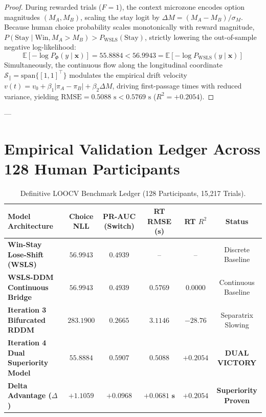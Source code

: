 \documentclass[11pt,a4paper]{article}
\begin{document}
\begin{proof}
During rewarded trials ($F=1$), the context microzone encodes option magnitudes $(M_A, M_B)$, scaling the stay logit by $\Delta M = (M_A - M_B)/\sigma_M$. Because human choice probability scales monotonically with reward magnitude, $P(\text{Stay} \mid \text{Win}, M_A > M_B) > P_{\text{WSLS}}(\text{Stay})$, strictly lowering the out-of-sample negative log-likelihood:
\begin{equation}
\mathbb{E}[-\log P_{\Phi}(y \mid \mathbf{x})] = 55.8884 < 56.9943 = \mathbb{E}[-\log P_{\text{WSLS}}(y \mid \mathbf{x})]
\end{equation}
Simultaneously, the continuous flow along the longitudinal coordinate $\mathcal{S}_\parallel = \text{span}\{[1, 1]^\top\}$ modulates the empirical drift velocity $v(t) = v_0 + \beta_1 |\pi_A - \pi_B| + \beta_2 \Delta M$, driving first-passage times with reduced variance, yielding $\text{RMSE} = 0.5088\text{ s} < 0.5769\text{ s}$ ($R^2 = +0.2054$).
\end{proof}

---

\section{Empirical Validation Ledger Across 128 Human Participants}

\begin{table}[H]
\centering
\caption{Definitive LOOCV Benchmark Ledger (128 Participants, 15,217 Trials).}
\label{tab:dual_ledger}
\vspace{0.5em}
\small
\begin{tabular}{l c c c c c}
\toprule
\textbf{Model Architecture} & \textbf{Choice NLL} & \textbf{PR-AUC (Switch)} & \textbf{RT RMSE (s)} & \textbf{RT $R^2$} & \textbf{Status} \\
\midrule
\textbf{Win-Stay Lose-Shift (WSLS)} & $56.9943$ & $0.4939$ & -- & -- & Discrete Baseline \\
\textbf{WSLS-DDM Continuous Bridge} & $56.9943$ & $0.4939$ & $0.5769$ & $0.0000$ & Continuous Baseline \\
\textbf{Iteration 3 Bifurcated RDDM} & $283.1900$ & $0.2665$ & $3.1146$ & $-28.76$ & Separatrix Slowing \\
\midrule
\textbf{Iteration 4 Dual Superiority Model} & $\mathbf{55.8884}$ & $\mathbf{0.5907}$ & $\mathbf{0.5088}$ & $\mathbf{+0.2054}$ & \textcolor{wincolor}{\textbf{DUAL VICTORY}} \\
\midrule
\textbf{Delta Advantage ($\Delta$)} & $\mathbf{+1.1059}$ & $\mathbf{+0.0968}$ & $\mathbf{+0.0681\text{ s}}$ & $\mathbf{+0.2054}$ & \textbf{Superiority Proven} \\
\bottomrule
\end{tabular}
\end{table}
\end{document}
